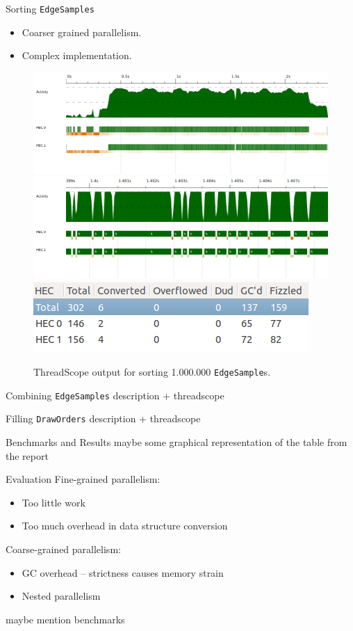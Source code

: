 \documentclass[slidestop,compress,mathserif, xcolor=table]{beamer}
\begin{document}
\begin{frame}[c]{Sorting \texttt{EdgeSamples}}
  \begin{itemize}
  \item Coarser grained parallelism.
  \item Complex implementation.
  \end{itemize}
 \begin{figure}[h!]
  \centering
  \includegraphics[width=0.7\linewidth,trim={0cm 2cm 0 0},clip]{../threadscope/sorting/sorting-final}\\
  \includegraphics[width=0.3\linewidth,trim={4cm 3cm 5cm 0},clip]{../threadscope/sorting/sorting-final-zoom}
  \includegraphics[width=0.4\linewidth,trim={0 0 0 1cm}]{../threadscope/sorting/sorting-final-sparks}
  \caption{ThreadScope output for sorting 1.000.000 \texttt{EdgeSample}s.}
  \label{fig:sorting-thread}
\end{figure}

\end{frame}

\begin{frame}[c]{Combining \texttt{EdgeSamples}}
description + threadscope
\end{frame}

\begin{frame}[c]{Filling \texttt{DrawOrders}}
description + threadscope
\end{frame}

\begin{frame}[c]{Benchmarks and Results}
maybe some graphical representation of the table from the report
\end{frame}

\begin{frame}[c]{Evaluation}
Fine-grained parallelism:
\begin{itemize}
\item Too little work
\item Too much overhead in data structure conversion
\end{itemize}
\bigskip

Coarse-grained parallelism:
\begin{itemize}
\item GC overhead -- strictness causes memory strain
\item Nested parallelism
\end{itemize}

maybe mention benchmarks
\end{frame}
\end{document}
